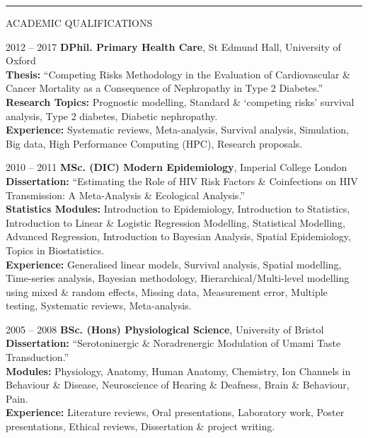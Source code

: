 \documentclass[10pt,a4paper]{article}
\begin{document}
\noindent\rule{\textwidth}{0.4pt}
\begin{cvlist}{ACADEMIC QUALIFICATIONS}

  \item[2012 -- 2017]
  \textbf{DPhil. Primary Health Care}, St Edmund Hall, University of Oxford \\
  \textbf{Thesis:} ``Competing Risks Methodology in the Evaluation of Cardiovascular \& Cancer Mortality as a Consequence of Nephropathy in Type 2 Diabetes.'' \\
  \textbf{Research Topics:} Prognostic modelling, Standard \& `competing risks' survival analysis, Type 2 diabetes, Diabetic nephropathy. \\
  \textbf{Experience:} Systematic reviews, Meta-analysis, Survival analysis, Simulation, Big data, High Performance Computing (HPC), Research proposals.

  \item[2010 -- 2011]
  \textbf{MSc. (DIC) Modern Epidemiology}, Imperial College London \\
  \textbf{Dissertation:} ``Estimating the Role of HIV Risk Factors \& Coinfections on HIV Transmission: A Meta-Analysis \& Ecological Analysis.'' \\
  \textbf{Statistics Modules:} Introduction to Epidemiology, Introduction to Statistics, Introduction to Linear \& Logistic Regression Modelling, Statistical Modelling, Advanced Regression, Introduction to Bayesian Analysis, Spatial Epidemiology, Topics in Biostatistics. \\
  \textbf{Experience:} Generalised linear models, Survival analysis, Spatial modelling, Time-series analysis, Bayesian methodology, Hierarchical/Multi-level modelling using mixed \& random effects, Missing data, Measurement error, Multiple testing, Systematic reviews, Meta-analysis.

  \item[2005 -- 2008]
  \textbf{BSc. (Hons) Physiological Science}, University of Bristol \\
  \textbf{Dissertation:} ``Serotoninergic \& Noradrenergic Modulation of Umami Taste Transduction.'' \\
  \textbf{Modules:} Physiology, Anatomy, Human Anatomy, Chemistry, Ion Channels in Behaviour \& Disease, Neuroscience of Hearing \& Deafness, Brain \& Behaviour, Pain. \\
  \textbf{Experience:} Literature reviews, Oral presentations, Laboratory work, Poster presentations, Ethical reviews, Dissertation \& project writing.

\end{cvlist}
\end{document}
